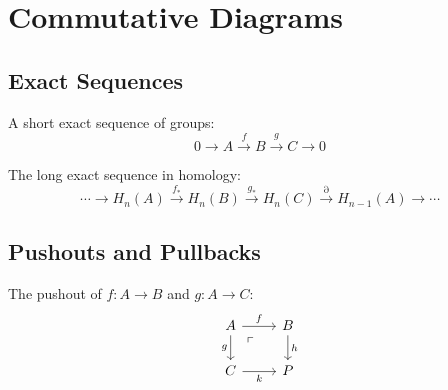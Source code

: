 \documentclass[
    language=english,
    doctype=article,
    institution=none,
    titlestyle=book,
]{../../omnilatex}
\theoremstyle{plain}
\theoremstyle{definition}
\theoremstyle{remark}
\begin{document}
\maketitle

\begin{abstract}
This gallery demonstrates 20 advanced mathematical typesetting techniques for
scientific publications, covering commutative diagrams, tensor notation, category
theory, proof environments, aligned equations, systems of equations, matrices,
operator definitions, dimensional analysis, chemical equations, logic, set theory,
probability, statistics, optimization, control theory, Fourier analysis,
differential geometry, algebraic structures, and number theory.
\end{abstract}

\tableofcontents

\section{Commutative Diagrams}
\label{sec:commutative-diagrams}

\subsection{Exact Sequences}

A short exact sequence of groups:
\begin{equation}\label{eq:short-exact}
    0 \longrightarrow A \xrightarrow{f} B \xrightarrow{g} C \longrightarrow 0
\end{equation}

The long exact sequence in homology:
\[
    \cdots \to H_n(A) \xrightarrow{f_*} H_n(B) \xrightarrow{g_*} H_n(C)
    \xrightarrow{\partial} H_{n-1}(A) \to \cdots
\]

\subsection{Pushouts and Pullbacks}

The pushout of $f\colon A \to B$ and $g\colon A \to C$:
\[
    \begin{tikzcd}
        A \arrow[r, "f"] \arrow[d, "g"'] & B \arrow[d, "h"] \\
        C \arrow[r, "k"'] & P \arrow[ul, phantom, "\ulcorner" near end]
    \end{tikzcd}
\]
\end{document}
